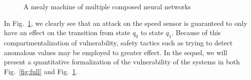 \begin{figure}[h!]
\centering
{}
\caption{A mealy machine of multiple composed neural networks}
\label{fig:components}
\end{figure}

In Fig.~\ref{fig:components}, we clearly see that an attack on the speed sensor is guaranteed to only have an effect on the transition from state $q_0$ to state $q_1$.
Because of this compartmentalization of vulnerability, safety tactics such as trying to detect anomalous values may be employed to greater effect.
In the sequel, we will present a quantitative formalization of the vulnerability of the systems in both Fig.~\ref{fig:full} and Fig.~\ref{fig:components}.
